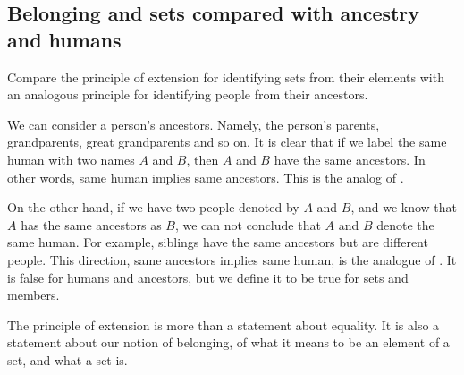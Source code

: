 \subsection*{Belonging and sets compared with ancestry and humans}

Compare the principle of extension for identifying sets from their elements with an analogous principle for identifying people from their ancestors.

We can consider a person's ancestors.
Namely, the person's parents, grandparents, great grandparents and so on.
It is clear that if we label the same human with two names $A$ and $B$, then $A$ and $B$ have the same ancestors.
In other words, same human implies same ancestors.
This is the analog of .

On the other hand, if we have two people denoted by $A$ and $B$, and we know that $A$ has the same ancestors as $B$, we can not conclude that $A$ and $B$ denote the same human.
For example, siblings have the same ancestors but are different people.
This direction, same ancestors implies same human, is the analogue of .
It is false for humans and ancestors, but we define it to be true for sets and members.

The principle of extension is more than a statement about equality.
It is also a statement about our notion of belonging, of what it means to be an element of a set, and what a set is.


